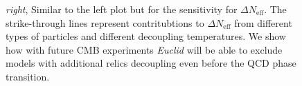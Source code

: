 \documentclass[a4paper,11pt]{article}
\newcommand{\euclid}{\textit{Euclid}\xspace}
\newcommand{\dneff}{\Delta N_\mathrm{eff}}
\begin{document}
\begin{figure}[!htbp]
{    \textit{right}, Similar to the left plot but for the sensitivity for $\dneff$. The strike-through lines represent contritubtions to $\dneff$ from different types of particles and different decoupling temperatures. We show how with future CMB experiments \euclid will be able to exclude models with additional relics decoupling even before the QCD phase transition.
    }
    \label{fig:results}
\end{figure}



\end{document}
